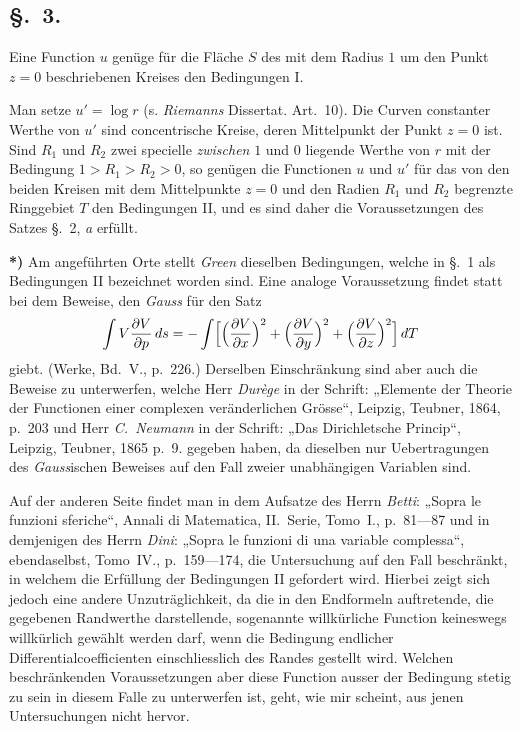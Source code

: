 \documentclass{article}
\begin{document}
\subsection*{§.~3.}

Eine Function $u$ genüge für die Fläche $S$ des mit dem Radius $1$ um den Punkt $z = 0$ beschriebenen Kreises den Bedingungen I.

Man setze $u' = \log r$ (s. \emph{Riemanns} Dissertat. Art.~10). Die Curven constanter Werthe von $u'$ sind concentrische Kreise, deren Mittelpunkt der Punkt $z = 0$ ist. Sind $R_1$ und $R_2$ zwei specielle \emph{zwischen} $1$ und $0$ liegende Werthe von $r$ mit der Bedingung $1 > R_1 > R_2 > 0$, so genügen die Functionen $u$ und $u'$ für das von den beiden Kreisen mit dem Mittelpunkte $z = 0$ und den Radien $R_1$ und $R_2$ begrenzte Ringgebiet $T$ den Bedingungen II, und es sind daher die Voraussetzungen des Satzes §.~2, \emph{a} erfüllt.

\textbf{*)} Am angeführten Orte stellt \emph{Green} dieselben Bedingungen, welche in §.~1 als Bedingungen II bezeichnet worden sind. Eine analoge Voraussetzung findet statt bei dem Beweise, den \emph{Gauss} für den Satz
\[
\int V \frac{\partial V}{\partial p}\,ds = -\int \Bigl[\Bigl(\frac{\partial V}{\partial x}\Bigr)^2 + \Bigl(\frac{\partial V}{\partial y}\Bigr)^2 + \Bigl(\frac{\partial V}{\partial z}\Bigr)^2\Bigr]\,dT
\]
giebt. (Werke, Bd.~V., p.~226.) Derselben Einschränkung sind aber auch die Beweise zu unterwerfen, welche Herr \emph{Durège} in der Schrift: „Elemente der Theorie der Functionen einer complexen veränderlichen Grösse“, Leipzig, Teubner, 1864, p.~203 und Herr \emph{C.~Neumann} in der Schrift: „Das Dirichletsche Princip“, Leipzig, Teubner, 1865 p.~9. gegeben haben, da dieselben nur Uebertragungen des \emph{Gauss}ischen Beweises auf den Fall zweier unabhängigen Variablen sind.

Auf der anderen Seite findet man in dem Aufsatze des Herrn \emph{Betti}: „Sopra le funzioni sferiche“, Annali di Matematica, II.~Serie, Tomo~I., p.~81---87 und in demjenigen des Herrn \emph{Dini}: „Sopra le funzioni di una variable complessa“, ebendaselbst, Tomo~IV., p.~159---174, die Untersuchung auf den Fall beschränkt, in welchem die Erfüllung der Bedingungen II gefordert wird. Hierbei zeigt sich jedoch eine andere Unzuträglichkeit, da die in den Endformeln auftretende, die gegebenen Randwerthe darstellende, sogenannte willkürliche Function keineswegs willkürlich gewählt werden darf, wenn die Bedingung endlicher Differentialcoefficienten einschliesslich des Randes gestellt wird. Welchen beschränkenden Voraussetzungen aber diese Function ausser der Bedingung stetig zu sein in diesem Falle zu unterwerfen ist, geht, wie mir scheint, aus jenen Untersuchungen nicht hervor.
\end{document}
